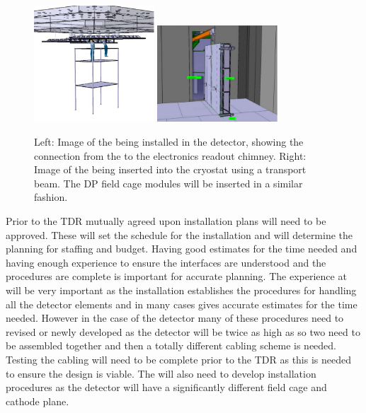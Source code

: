 \begin{figure}[htbp]
\begin{center}
\includegraphics[width=0.4\textwidth]{far-detector-single-phase/figures/CRP-install.pdf}
\includegraphics[width=0.4\textwidth]{far-detector-single-phase/figures/CRP-into-cryostat.pdf}
\caption{Left: Image of the   being installed in
  the detector, showing the connection from the  to the
  electronics readout chimney. Right: Image of the  being
  inserted into the cryostat using a transport beam.  The DP field
  cage modules will be inserted in a similar fashion.}
\label{fig:CRP-Install}
\end{center}
\end{figure}



Prior to the TDR mutually agreed upon installation plans will need to
be approved. These will set the schedule for the installation and will
determine the planning for staffing and budget. Having good estimates
for the time needed and having enough experience to ensure the
interfaces are understood and the procedures are complete is important
for accurate planning. The experience at  will be
very important as the  installation establishes the
procedures for handling all the detector elements and in many cases
gives accurate estimates for the time needed. However in the case of
the  detector many of these procedures need to revised or
newly developed as the  detector will be twice as high as
 so two  need to be assembled together
and then a totally different cabling scheme is needed. Testing the
cabling will need to be complete prior to the TDR as this is needed to
ensure the design is viable. The  will also need to develop
installation procedures as the   detector
will have a significantly different field cage and cathode plane. 

